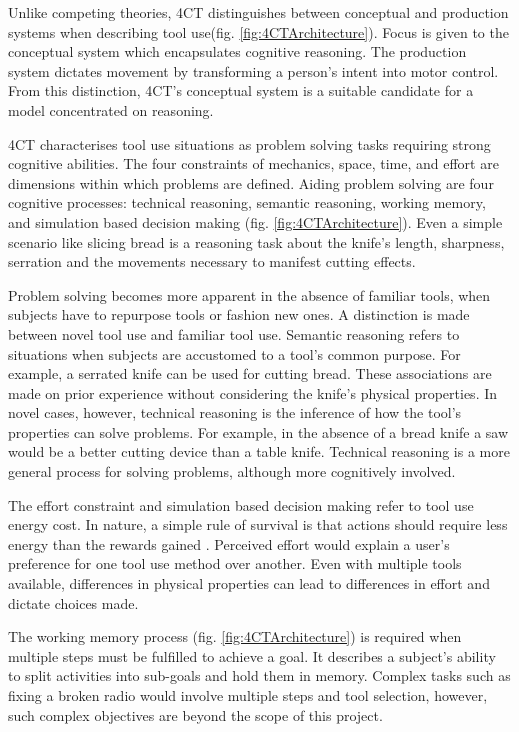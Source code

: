 \documentclass[11]{article}
\begin{document}
Unlike competing theories, 4CT distinguishes between conceptual and production systems when describing tool use(fig. \ref{fig:4CTArchitecture}).
Focus is given to the conceptual system which encapsulates cognitive reasoning.
The production system dictates movement by transforming a person's intent into motor control. 
From this distinction, 4CT's conceptual system is a suitable candidate for a model concentrated on reasoning.


4CT characterises tool use situations as problem solving tasks requiring strong cognitive abilities. 
The four constraints of mechanics, space, time, and effort are dimensions within which problems are defined.
Aiding problem solving are four cognitive processes: technical reasoning, semantic reasoning, working memory, and simulation based decision making (fig. \ref{fig:4CTArchitecture}).  
Even a simple scenario like slicing bread is a reasoning task about the knife's length, sharpness, serration and the movements necessary to manifest cutting effects. 

Problem solving becomes more apparent in the absence of familiar tools, when subjects have to repurpose tools or fashion new ones.
A distinction is made between novel tool use and familiar tool use. 
Semantic reasoning refers to situations when subjects are accustomed to a tool's common purpose. 
For example, a serrated knife can be used for cutting bread. 
These associations are made on prior experience without considering the knife's physical properties.  
In novel cases, however, technical reasoning is the inference of how the tool's properties can solve problems.
For example, in the absence of a bread knife a saw would be a better cutting device than a table knife. 
Technical reasoning is a more general process for solving problems, although more cognitively involved.  

The effort constraint and simulation based decision making refer to tool use energy cost. 
In nature, a simple rule of survival is that actions should require less energy than the rewards gained \cite{proffitt2006}.
Perceived effort would explain a user's preference for one tool use method over another. 
Even with multiple tools available, differences in physical properties can lead to differences in effort and dictate choices made. 

The working memory process (fig. \ref{fig:4CTArchitecture}) is required when multiple steps must be fulfilled to achieve a goal. 
It describes a subject's ability to split activities into sub-goals and hold them in memory. 
Complex tasks such as fixing a broken radio would involve multiple steps and tool selection, however, such complex objectives are beyond the scope of this project.
\end{document}
